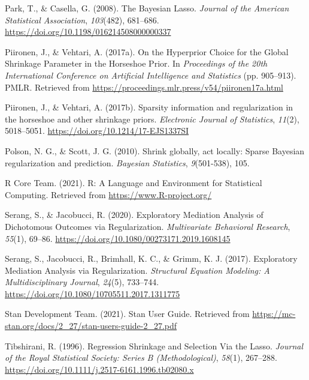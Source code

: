\documentclass[
  english,
  man, donotrepeattitle,floatsintext]{apa6}
\newlength{\cslhangindent}
\newlength{\cslentryspacingunit} %
\newenvironment{CSLReferences}[2] %
 {%
  \setlength{\parindent}{0pt}
  \ifodd #1
  \let\oldpar\par
  \def\par{\hangindent=\cslhangindent\oldpar}
  \fi
  \setlength{\parskip}{#2\cslentryspacingunit}
 }%
 {}
\begin{document}
\begin{CSLReferences}{1}{0}
\leavevmode{}%
Park, T., \& Casella, G. (2008). The {Bayesian} {Lasso}. \emph{Journal of the American Statistical Association}, \emph{103}(482), 681--686. \url{https://doi.org/10.1198/016214508000000337}

\leavevmode{}%
Piironen, J., \& Vehtari, A. (2017a). On the {Hyperprior} {Choice} for the {Global} {Shrinkage} {Parameter} in the {Horseshoe} {Prior}. In \emph{Proceedings of the 20th {International} {Conference} on {Artificial} {Intelligence} and {Statistics}} (pp. 905--913). PMLR. Retrieved from \url{https://proceedings.mlr.press/v54/piironen17a.html}

\leavevmode{}%
Piironen, J., \& Vehtari, A. (2017b). Sparsity information and regularization in the horseshoe and other shrinkage priors. \emph{Electronic Journal of Statistics}, \emph{11}(2), 5018--5051. \url{https://doi.org/10.1214/17-EJS1337SI}

\leavevmode{}%
Polson, N. G., \& Scott, J. G. (2010). Shrink globally, act locally: {Sparse} {Bayesian} regularization and prediction. \emph{Bayesian Statistics}, \emph{9}(501-538), 105.

\leavevmode{}%
R Core Team. (2021). R: {A} {Language} and {Environment} for {Statistical} {Computing}. Retrieved from \url{https://www.R-project.org/}

\leavevmode{}%
Serang, S., \& Jacobucci, R. (2020). Exploratory {Mediation} {Analysis} of {Dichotomous} {Outcomes} via {Regularization}. \emph{Multivariate Behavioral Research}, \emph{55}(1), 69--86. \url{https://doi.org/10.1080/00273171.2019.1608145}

\leavevmode{}%
Serang, S., Jacobucci, R., Brimhall, K. C., \& Grimm, K. J. (2017). Exploratory {Mediation} {Analysis} via {Regularization}. \emph{Structural Equation Modeling: A Multidisciplinary Journal}, \emph{24}(5), 733--744. \url{https://doi.org/10.1080/10705511.2017.1311775}

\leavevmode{}%
Stan Development Team. (2021). Stan {User} {Guide}. Retrieved from \url{https://mc-stan.org/docs/2_27/stan-users-guide-2_27.pdf}

\leavevmode{}%
Tibshirani, R. (1996). Regression {Shrinkage} and {Selection} {Via} the {Lasso}. \emph{Journal of the Royal Statistical Society: Series B (Methodological)}, \emph{58}(1), 267--288. \url{https://doi.org/10.1111/j.2517-6161.1996.tb02080.x}


\end{CSLReferences}
\end{document}
